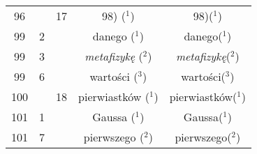 \documentclass[a4paper,11pt]{article}
\numberwithin{equation}{section}
\begin{document}
\begin{center}
\begin{tabular}{|c|c|c|c|c|}
    96  & & 17 & 98) ($^{ 1 }$) & 98)($^{ 1 }$) \\
    99  &  2 & & danego ($^{ 1 }$) & danego($^{ 1 }$) \\
    99  &  3 & & \textit{metafizykę} ($^{ 2 }$)
           & \textit{metafizykę}($^{ 2 }$) \\
    99  &  6 & & wartości ($^{ 3 }$) & wartości($^{ 3 }$) \\
    100 & & 18 & pierwiastków ($^{ 1 }$) & pierwiastków($^{ 1 }$) \\
    101 &  1 & & Gaussa ($^{ 1 }$) & Gaussa($^{ 1 }$) \\
    101 &  7 & & pierwszego ($^{ 2 }$) & pierwszego($^{ 2 }$) \\
    \hline
  \end{tabular}





  \newpage


\end{center}
\end{document}
